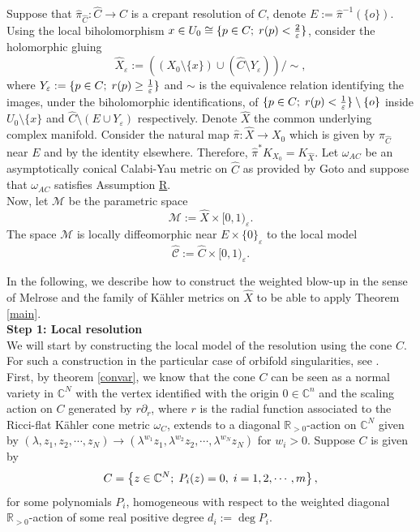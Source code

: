 \documentclass[a4paper,11pt]{article}
\def\C{\mathbb{C}}
\def\R{\mathbb{R}}
\begin{document}
Suppose that $\hat \pi_{\hat C} : \hat{C} \rightarrow C$ is a crepant resolution of $C$, denote $E := \hat{\pi}^{-1} ( \{ o\})$. Using the local biholomorphism $x \in U_0 \cong \{p \in C; \hspace{0.1cm} r(p) < \frac{2}{\varepsilon} \} $, consider the holomorphic gluing $$\hat X_\varepsilon := \left((X_0 \setminus \{ x\}) \cup  (\hat{C} \setminus Y_\varepsilon) \right) \Big/ \sim,$$ where $Y_\varepsilon := \{p \in C; \hspace{0.1cm} r(p) \geq \frac{1}{\varepsilon} \}$ and $\sim$ is the equivalence relation identifying the images, under the biholomorphic identifications, of $\{p \in C; \hspace{0.1cm} r(p) < \frac{1}{\varepsilon} \} \setminus \{ o\}$ inside $U_{ 0} \setminus \{ x\}$ and $\hat C \setminus (E \cup Y_{ \varepsilon})$ respectively. Denote $\hat X$ the common underlying complex manifold. Consider the natural map $\hat \pi : \hat X \rightarrow X_0$ which is given by $\pi_{\hat C}$ near $E$ and by the identity elsewhere. Therefore, $\hat \pi^{*}K_{X_0} = K_{\hat X}$. Let $\omega_{AC}$ be an asymptotically conical Calabi-Yau metric on $\hat C$ as provided by Goto \cite{goto_calabi-yau_2012} and suppose that $\omega_{AC}$ satisfies Assumption \hyperlink{R}{R}.\\
Now, let $\mathcal{M}$ be the parametric space 
    $$
    \mathcal{M} := \hat X \times [0,1)_\varepsilon.
    $$
    The space $\mathcal{M}$ is locally diffeomorphic near $E \times \{ 0\}_\varepsilon$ to the local model 
    $$
    \hat{\mathcal{C}} := \hat C \times [0,1)_\varepsilon.
    $$

In the following, we describe how to construct the weighted blow-up in the sense of Melrose and the family of Kähler metrics on $\hat{X}$ to be able to apply Theorem \ref{main}.\\

\textbf{Step 1: Local resolution}\\
We will start by constructing the local model of the resolution using the cone $C$. For such a construction in the particular case of orbifold singularities, see \cite[Section 5]{najafpour2024constant}.\\

First, by theorem \ref{convar}, we know that the cone $C$ can be seen as a normal variety in $\C^N$ with the vertex identified with the origin $0 \in \C^n$ and the scaling action on $C$ generated by $r \partial_r$, where $r$ is the radial function associated to the Ricci-flat Kähler cone metric $\omega_C$,  extends to a diagonal $\R_{>0}$-action on $\C^N$ given by $(\lambda, z_1, z_2, \cdots, z_N) \to (\lambda^{w_1} z_1, \lambda^{w_2} z_2, \cdots, \lambda^{w_N} z_N)$ for $w_i >0$. Suppose $C$ is given by 
$$
C = \left\{z \in \C^N; \hspace{0.1cm} P_i(z)=0, \hspace{0.1cm} i =1,2, \cdots, m \right\}, 
$$
for some polynomials $P_i$, homogeneous with respect to the weighted diagonal $\R_{>0}$-action of some real positive degree $d_i:= \deg P_i$.\\
\end{document}
